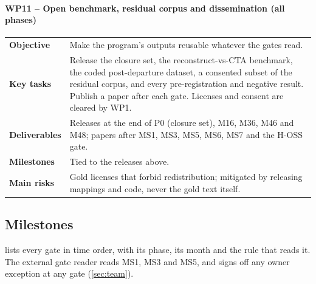 \paragraph{WP11 -- Open benchmark, residual corpus and dissemination (all phases)}
\mbox{}\par
\begin{tabularx}{\linewidth}{@{}>{\bfseries}p{2.6cm}X@{}}
  \toprule
  Objective & Make the program's outputs reusable whatever the gates read. \\
  Key tasks & Release the closure set, the reconstruct-vs-CTA benchmark, the coded post-departure
    dataset, a consented subset of the residual corpus, and every pre-registration and negative
    result. Publish a paper after each gate. Licenses and consent are cleared by WP1. \\
  Deliverables & Releases at the end of P0 (closure set), M16, M36, M46 and M48; papers after MS1,
    MS3, MS5, MS6, MS7 and the H-OSS gate. \\
  Milestones & Tied to the releases above. \\
  Main risks & Gold licenses that forbid redistribution; mitigated by releasing mappings and code,
    never the gold text itself. \\
  \bottomrule
\end{tabularx}

\normalsize

\FloatBarrier
\subsection{Milestones}

 lists every gate in time order, with its phase, its month and the rule that
reads it. The external gate reader reads MS1, MS3 and MS5, and signs off any owner exception
at any gate (\cref{sec:team}).

